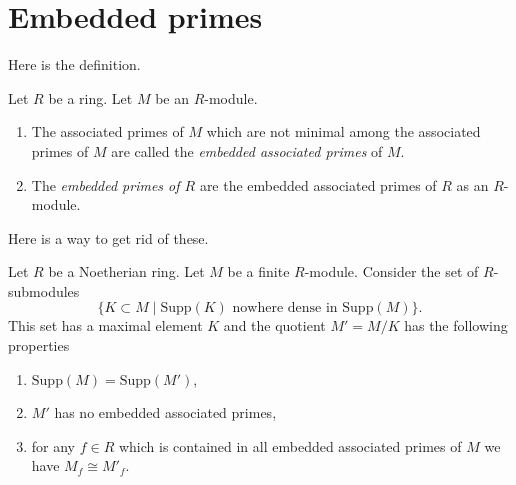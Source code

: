 \section{Embedded primes}
\label{section-embedded-primes}

\noindent
Here is the definition.

\begin{definition}
\label{definition-embedded-primes}
Let $R$ be a ring.
Let $M$ be an $R$-module.
\begin{enumerate}
\item  The associated primes of $M$ which are
not minimal among the associated primes of $M$ are called the
{\it embedded associated primes} of $M$.
\item The {\it embedded primes of $R$}
are the embedded associated primes of $R$ as an $R$-module.
\end{enumerate}
\end{definition}

\noindent
Here is a way to get rid of these.

\begin{lemma}
\label{lemma-remove-embedded-primes}
Let $R$ be a Noetherian ring.
Let $M$ be a finite $R$-module.
Consider the set of $R$-submodules
$$
\{
K \subset M
\mid
\text{Supp}(K)
\text{ nowhere dense in }
\text{Supp}(M)
\}.
$$
This set has a maximal element $K$ and the quotient
$M' = M/K$ has the following properties
\begin{enumerate}
\item $\text{Supp}(M) = \text{Supp}(M')$,
\item $M'$ has no embedded associated primes,
\item for any $f \in R$ which is contained in all
embedded associated primes of $M$ we have $M_f \cong M'_f$.
\end{enumerate}
\end{lemma}

